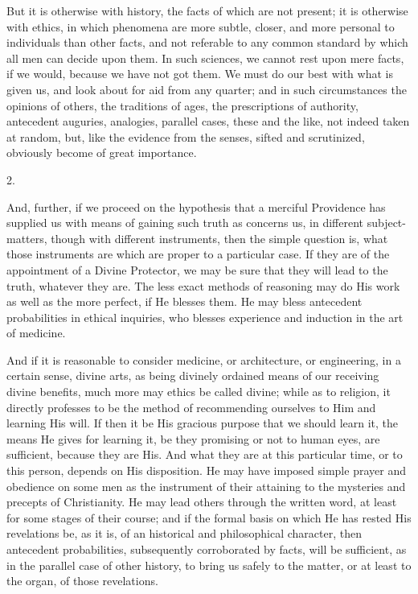 But it is otherwise with history, the facts of which
are not present; it is otherwise with ethics, in which
phenomena are more subtle, closer, and more personal to
individuals than other facts, and not referable to any
common standard by which all men can decide upon them. In
such sciences, we cannot rest upon mere facts, if we
would, because we have not got them. We must do our best
with what is given us, and look about for aid from any
quarter; and in such circumstances the opinions of
others, the traditions of ages, the prescriptions of
authority, antecedent auguries, analogies, parallel
cases, these and the like, not indeed taken at random,
but, like the evidence from the senses, sifted and
scrutinized, obviously become of great importance.

2.

And, further, if we proceed on the hypothesis that a
merciful Providence has supplied us with means of gaining
such truth as concerns us, in different subject-matters,
though with different instruments, then the simple
question is, what those instruments are which are proper
to a particular case. If they are of the appointment of a
Divine Protector, we may be sure that they will lead to
the truth, whatever they are. The less exact methods of
reasoning may do His work as well as the more perfect, if
He blesses them. He may bless antecedent probabilities in
ethical inquiries, who blesses experience and induction
in the art of medicine.

And if it is reasonable to consider medicine, or
architecture, or engineering, in a certain sense, divine
arts, as being divinely ordained means of our receiving
divine benefits, much more may ethics be called divine;
while as to religion, it directly professes to be the
method of recommending ourselves to Him and learning His
will. If then it be His gracious purpose that we should
learn it, the means He gives for learning it, be they
promising or not to human eyes, are sufficient, because
they are His. And what they are at this particular time,
or to this person, depends on His disposition. He may
have imposed simple prayer and obedience on some men as
the instrument of their attaining to the mysteries and
precepts of Christianity. He may lead others through the
written word, at least for some stages of their course;
and if the formal basis on which He has rested His
revelations be, as it is, of an historical and
philosophical character, then antecedent probabilities,
subsequently corroborated by facts, will be sufficient,
as in the parallel case of other history, to bring us
safely to the matter, or at least to the organ, of those
revelations.

